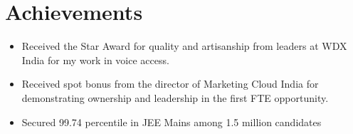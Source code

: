 \documentclass[letterpaper,11pt]{article}
\newcommand{\listItem}[1]{
  \item\small{{#1 \vspace{-2pt}}
  }
}
\newcommand{\resumeSubHeadingListStart}{\begin{itemize}[leftmargin=*]}
\newcommand{\resumeSubHeadingListEnd}{\end{itemize}}
\newcommand{\resumeListItem}[1]{\listItem{#1}\vspace{-4pt}}
\begin{document}
\section{Achievements}
 \resumeSubHeadingListStart
   \resumeListItem
      {Received the Star Award for quality and artisanship from leaders at WDX India for my work in voice access.}
    \resumeListItem
      {Received spot bonus from the director of Marketing Cloud India for demonstrating ownership and leadership in the first FTE opportunity.}
    \resumeListItem
      {Secured 99.74 percentile in JEE Mains among 1.5 million candidates}
 \resumeSubHeadingListEnd
 
\end{document}
